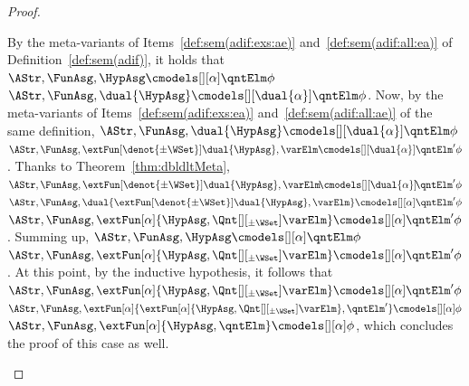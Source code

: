 \documentclass[authoryear]{elsarticle}
\begin{document}
\begin{proof}
\begin{itemize}[$\bullet$]
\begin{itemize}[$-$]
            By the meta-variants of Items~\ref{def:sem(adif:exs:ae)}
            and~\ref{def:sem(adif:all:ea)} of Definition~\ref{def:sem(adif)},
            it holds that $\AStr, \FunAsg, \HypAsg \cmodels[][\alpha] \qntElm
            \phi$ \iff $\AStr, \FunAsg, \dual{\HypAsg} \cmodels[][\dual{\alpha}]
            \qntElm \phi$.
            Now, by the meta-variants of Items~\ref{def:sem(adif:exs:ea)}
            and~\ref{def:sem(adif:all:ae)} of the same definition, $\AStr,
            \FunAsg, \dual{\HypAsg} \cmodels[][\dual{\alpha}] \qntElm \phi$ \iff
            $\AStr, \FunAsg, \extFun[\denot{\pm\WSet}]{\dual{\HypAsg}, \varElm}
            \cmodels[][\dual{\alpha}] \qntElm' \phi$.
            Thanks to Theorem~\ref{thm:dbldltMeta}, $\AStr, \FunAsg,
            \extFun[\denot{\pm\WSet}]{\dual{\HypAsg}, \varElm}
            \!\cmodels[][\dual{\alpha}]\! \qntElm' \phi$ \iff $\AStr, \FunAsg,
            \dual{\extFun[\denot{\pm\WSet}]{\dual{\HypAsg}, \varElm}}
            \cmodels[][\alpha] \qntElm' \phi$ \iff $\AStr, \FunAsg,
            \extFun[\alpha]{\HypAsg,
              \Qnt[][_{\pm\WSet}] \varElm} \cmodels[][\alpha] \qntElm' \phi$.
            Summing up, $\AStr, \FunAsg, \HypAsg \cmodels[][\alpha] \qntElm
            \phi$ \iff $\AStr, \FunAsg, \extFun[\alpha]{\HypAsg,
            \Qnt[][_{\pm\WSet}] \varElm} \cmodels[][\alpha] \qntElm' \phi$.
            At this point, by the inductive hypothesis, it follows that $\AStr,
            \FunAsg, \extFun[\alpha]{\HypAsg, \Qnt[][_{\pm\WSet}] \varElm}
            \cmodels[][\alpha] \qntElm' \phi$ \iff $\AStr, \FunAsg,
            \extFun[\alpha]{\extFun[\alpha]{\HypAsg, \Qnt[][_{\pm\WSet}]
            \varElm}, \qntElm'} \cmodels[][\alpha] \phi$ \iff $\AStr, \FunAsg,
            \extFun[\alpha]{\HypAsg, \qntElm} \cmodels[][\alpha] \phi$, which
            concludes the proof of this case as well.
            \qedhere
        \end{itemize}
  \end{itemize}
\end{proof}
\end{document}
